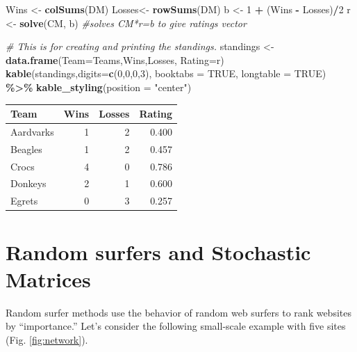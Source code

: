 \documentclass[
]{book}
\newenvironment{Shaded}{\begin{snugshade}}{\end{snugshade}}
\newcommand{\AttributeTok}[1]{\textcolor[rgb]{0.13,0.29,0.53}{#1}}
\newcommand{\CommentTok}[1]{\textcolor[rgb]{0.56,0.35,0.01}{\textit{#1}}}
\newcommand{\ConstantTok}[1]{\textcolor[rgb]{0.56,0.35,0.01}{#1}}
\newcommand{\DecValTok}[1]{\textcolor[rgb]{0.00,0.00,0.81}{#1}}
\newcommand{\FunctionTok}[1]{\textcolor[rgb]{0.13,0.29,0.53}{\textbf{#1}}}
\newcommand{\NormalTok}[1]{#1}
\newcommand{\OtherTok}[1]{\textcolor[rgb]{0.56,0.35,0.01}{#1}}
\newcommand{\SpecialCharTok}[1]{\textcolor[rgb]{0.81,0.36,0.00}{\textbf{#1}}}
\newcommand{\StringTok}[1]{\textcolor[rgb]{0.31,0.60,0.02}{#1}}
\theoremstyle{definition}
\theoremstyle{definition}
\theoremstyle{definition}
\theoremstyle{definition}
\theoremstyle{remark}
\begin{document}
\begin{Shaded}
\begin{Highlighting}[]
\NormalTok{Wins }\OtherTok{\textless{}{-}} \FunctionTok{colSums}\NormalTok{(DM)}
\NormalTok{Losses}\OtherTok{\textless{}{-}} \FunctionTok{rowSums}\NormalTok{(DM)}
\NormalTok{b }\OtherTok{\textless{}{-}} \DecValTok{1} \SpecialCharTok{+}\NormalTok{ (Wins }\SpecialCharTok{{-}}\NormalTok{ Losses)}\SpecialCharTok{/}\DecValTok{2}
\NormalTok{r }\OtherTok{\textless{}{-}} \FunctionTok{solve}\NormalTok{(CM, b)  }\CommentTok{\#solves CM*r=b to give ratings vector}

\CommentTok{\# This is for creating and printing the standings.}
\NormalTok{standings }\OtherTok{\textless{}{-}} \FunctionTok{data.frame}\NormalTok{(}\AttributeTok{Team=}\NormalTok{Teams,Wins,Losses, }\AttributeTok{Rating=}\NormalTok{r)}
\FunctionTok{kable}\NormalTok{(standings,}\AttributeTok{digits=}\FunctionTok{c}\NormalTok{(}\DecValTok{0}\NormalTok{,}\DecValTok{0}\NormalTok{,}\DecValTok{0}\NormalTok{,}\DecValTok{3}\NormalTok{), }\AttributeTok{booktabs =} \ConstantTok{TRUE}\NormalTok{,}
       \AttributeTok{longtable =} \ConstantTok{TRUE}\NormalTok{) }\SpecialCharTok{\%\textgreater{}\%}
    \FunctionTok{kable\_styling}\NormalTok{(}\AttributeTok{position =} \StringTok{"center"}\NormalTok{)}
\end{Highlighting}
\end{Shaded}

\begin{longtable}{lrrr}
\toprule
Team & Wins & Losses & Rating\\
\midrule
Aardvarks & 1 & 2 & 0.400\\
Beagles & 1 & 2 & 0.457\\
Crocs & 4 & 0 & 0.786\\
Donkeys & 2 & 1 & 0.600\\
Egrets & 0 & 3 & 0.257\\
\bottomrule
\end{longtable}

\section{Random surfers and Stochastic Matrices}\label{random-surfers-and-stochastic-matrices}

Random surfer methods use the behavior of random web surfers to rank websites by ``importance.'' Let's consider the following small-scale example with five sites (Fig. \ref{fig:network}).
\end{document}
